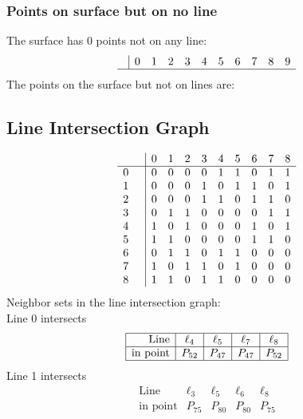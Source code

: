 \documentclass{article}
\begin{document}
{\subsubsection*{Points on surface but on no line}
The surface has 0 points not on any line:\\
$$
\begin{array}{r|*{10}{r}}
 & 0 & 1 & 2 & 3 & 4 & 5 & 6 & 7 & 8 & 9\\
\hline
\end{array}
$$
The points on the surface but not on lines are:\\
\begin{multicols}{2}
\noindent
\end{multicols}
\subsection*{Line Intersection Graph}
{\arraycolsep=1pt
$$
\begin{array}{rr|*{9}r}
 &  & 0 & 1 & 2 & 3 & 4 & 5 & 6 & 7 & 8\\
\hline
0 &  & 0 & 0 & 0 & 0 & 1 & 1 & 0 & 1 & 1\\
1 &  & 0 & 0 & 0 & 1 & 0 & 1 & 1 & 0 & 1\\
2 &  & 0 & 0 & 0 & 1 & 1 & 0 & 1 & 1 & 0\\
3 &  & 0 & 1 & 1 & 0 & 0 & 0 & 0 & 1 & 1\\
4 &  & 1 & 0 & 1 & 0 & 0 & 0 & 1 & 0 & 1\\
5 &  & 1 & 1 & 0 & 0 & 0 & 0 & 1 & 1 & 0\\
6 &  & 0 & 1 & 1 & 0 & 1 & 1 & 0 & 0 & 0\\
7 &  & 1 & 0 & 1 & 1 & 0 & 1 & 0 & 0 & 0\\
8 &  & 1 & 1 & 0 & 1 & 1 & 0 & 0 & 0 & 0\\
\end{array}
$$
}%
Neighbor sets in the line intersection graph:\\
Line 0 intersects 
$$
\begin{array}{|r*{4}{|c}|}
\hline
\mbox{Line}  & \ell_{4} & \ell_{5} & \ell_{7} & \ell_{8}\\
\hline
\mbox{in point}  & P_{52} & P_{47} & P_{47} & P_{52}\\
\hline
\end{array}
$$
Line 1 intersects 
$$
\begin{array}{|r*{4}{|c}|}
\hline
\mbox{Line}  & \ell_{3} & \ell_{5} & \ell_{6} & \ell_{8}\\
\hline
\mbox{in point}  & P_{75} & P_{80} & P_{80} & P_{75}\\

\end{array}$$}
\end{document}
